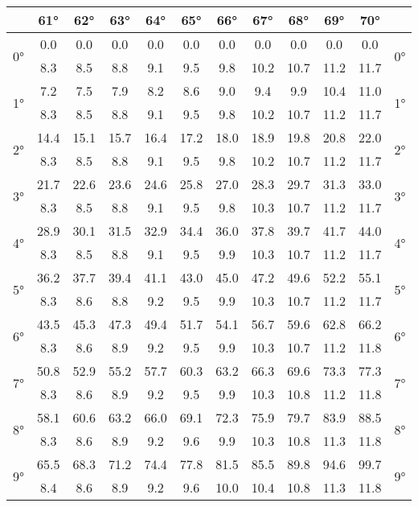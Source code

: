 \begin{scriptsize}\begin{tabular}{c || c | c | c | c | c | c | c | c | c | c || c}
		\space &61°&62°&63°&64°&65°&66°&67°&68°&69°&70°\\\hline\hline
		\multirow{2}{*}{0°}&0.0&0.0&0.0&0.0&0.0&0.0&0.0&0.0&0.0&0.0&\multirow{2}{*}{0°}\\ \space&8.3&8.5&8.8&9.1&9.5&9.8&10.2&10.7&11.2&11.7&\space\\\hline
		\multirow{2}{*}{1°}&7.2&7.5&7.9&8.2&8.6&9.0&9.4&9.9&10.4&11.0&\multirow{2}{*}{1°}\\ \space&8.3&8.5&8.8&9.1&9.5&9.8&10.2&10.7&11.2&11.7&\space\\\hline
		\multirow{2}{*}{2°}&14.4&15.1&15.7&16.4&17.2&18.0&18.9&19.8&20.8&22.0&\multirow{2}{*}{2°}\\ \space&8.3&8.5&8.8&9.1&9.5&9.8&10.2&10.7&11.2&11.7&\space\\\hline
		\multirow{2}{*}{3°}&21.7&22.6&23.6&24.6&25.8&27.0&28.3&29.7&31.3&33.0&\multirow{2}{*}{3°}\\ \space&8.3&8.5&8.8&9.1&9.5&9.8&10.3&10.7&11.2&11.7&\space\\\hline
		\multirow{2}{*}{4°}&28.9&30.1&31.5&32.9&34.4&36.0&37.8&39.7&41.7&44.0&\multirow{2}{*}{4°}\\ \space&8.3&8.5&8.8&9.1&9.5&9.9&10.3&10.7&11.2&11.7&\space\\\hline
		\multirow{2}{*}{5°}&36.2&37.7&39.4&41.1&43.0&45.0&47.2&49.6&52.2&55.1&\multirow{2}{*}{5°}\\ \space&8.3&8.6&8.8&9.2&9.5&9.9&10.3&10.7&11.2&11.7&\space\\\hline
		\multirow{2}{*}{6°}&43.5&45.3&47.3&49.4&51.7&54.1&56.7&59.6&62.8&66.2&\multirow{2}{*}{6°}\\ \space&8.3&8.6&8.9&9.2&9.5&9.9&10.3&10.7&11.2&11.8&\space\\\hline
		\multirow{2}{*}{7°}&50.8&52.9&55.2&57.7&60.3&63.2&66.3&69.6&73.3&77.3&\multirow{2}{*}{7°}\\ \space&8.3&8.6&8.9&9.2&9.5&9.9&10.3&10.8&11.2&11.8&\space\\\hline
		\multirow{2}{*}{8°}&58.1&60.6&63.2&66.0&69.1&72.3&75.9&79.7&83.9&88.5&\multirow{2}{*}{8°}\\ \space&8.3&8.6&8.9&9.2&9.6&9.9&10.3&10.8&11.3&11.8&\space\\\hline
		\multirow{2}{*}{9°}&65.5&68.3&71.2&74.4&77.8&81.5&85.5&89.8&94.6&99.7&\multirow{2}{*}{9°}\\ \space&8.4&8.6&8.9&9.2&9.6&10.0&10.4&10.8&11.3&11.8&\space\\\hline

\end{tabular}
\end{scriptsize}
